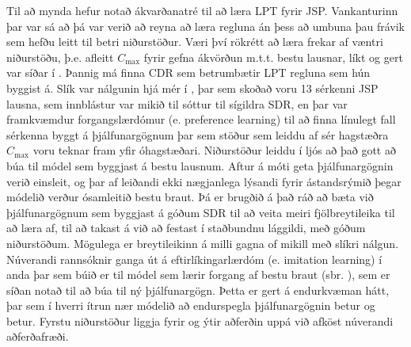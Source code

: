 \documentclass[10pt,a4paper]{article}
\begin{document}
Til að mynda hefur \cite{Siggi05} notað ákvarðanatré til að læra LPT fyrir JSP. 
Vankanturinn þar var sá að þá var verið að reyna að læra regluna án þess að 
umbuna þau frávik sem hefðu leitt til betri niðurstöður. 
Væri því rökrétt að læra frekar af væntri niðurstöðu, þ.e. afleitt $C_{\max}$ 
fyrir gefna ákvörðun m.t.t. bestu lausnar, líkt og gert var síðar í 
\cite{Siggi10,Siggi10,Malik08,Russell09}. Þannig má finna CDR sem betrumbætir 
LPT regluna sem hún byggist á. Slík var nálgunin hjá mér í \cite{InRu15a}, þar 
sem skoðað voru 13 sérkenni JSP lausna, sem innblástur var mikið til sóttur til 
sígildra SDR, en þar var framkvæmdur forgangslærdómur (e. preference learning) 
til að finna línulegt fall sérkenna byggt á þjálfunargögnum þar sem stöður sem 
leiddu af sér hagstæðra $C_{\max}$ voru teknar fram yfir óhagstæðari. 
Niðurstöður leiddu í ljós að það gott að búa til módel sem byggjast á bestu 
lausnum. Aftur á móti geta þjálfunargögnin verið einsleit, og þar af leiðandi 
ekki nægjanlega lýsandi fyrir ástandsrýmið þegar módelið verður ósamleitið 
bestu braut. Þá er brugðið á það ráð að bæta við þjálfunargögnum sem byggjast á 
góðum SDR til að veita meiri fjölbreytileika til að læra af, til að takast á 
við að festast í staðbundnu lággildi, með góðum niðurstöðum. 
Mögulega er breytileikinn á milli gagna of mikill með slíkri nálgun. 
Núverandi rannsóknir ganga út á eftirlíkingarlærdóm (e. imitation learning) í 
anda \cite{RossB10,RossGB11} þar sem búið er til módel sem lærir forgang af 
bestu braut (sbr. \cite{InRu11a,InRu15a}), sem er síðan notað til að búa til ný 
þjálfunargögn. Þetta er gert á endurkvæman hátt, þar sem í hverri ítrun 
nær módelið að endurspegla þjálfunargögnin betur og betur. Fyrstu niðurstöður 
liggja fyrir og ýtir aðferðin uppá við afköst núverandi aðferðafræði. 



  
\end{document}
